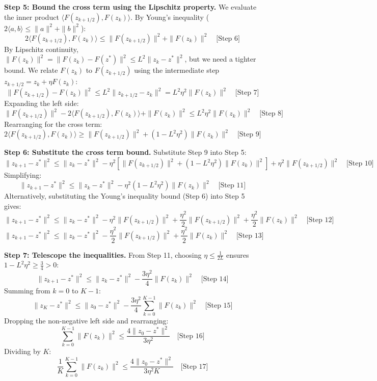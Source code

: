 \documentclass{article}
\begin{document}
\textbf{Step 5: Bound the cross term using the Lipschitz property.}
We evaluate the inner product $\langle F(z_{k+1/2}), F(z_k) \rangle$. By Young's inequality ($2\langle a, b \rangle \leq \|a\|^2 + \|b\|^2$):
$$ 2\langle F(z_{k+1/2}), F(z_k) \rangle \leq \|F(z_{k+1/2})\|^2 + \|F(z_k)\|^2 \quad \text{[Step 6]} $$
By Lipschitz continuity, $\|F(z_k)\|^2 = \|F(z_k) - F(z^*)\|^2 \leq L^2 \|z_k - z^*\|^2$, but we need a tighter bound. We relate $F(z_k)$ to $F(z_{k+1/2})$ using the intermediate step $z_{k+1/2} = z_k + \eta F(z_k)$:
$$ \|F(z_{k+1/2}) - F(z_k)\|^2 \leq L^2 \|z_{k+1/2} - z_k\|^2 = L^2 \eta^2 \|F(z_k)\|^2 \quad \text{[Step 7]} $$
Expanding the left side:
$$ \|F(z_{k+1/2})\|^2 - 2\langle F(z_{k+1/2}), F(z_k) \rangle + \|F(z_k)\|^2 \leq L^2 \eta^2 \|F(z_k)\|^2 \quad \text{[Step 8]} $$
Rearranging for the cross term:
$$ 2\langle F(z_{k+1/2}), F(z_k) \rangle \geq \|F(z_{k+1/2})\|^2 + (1 - L^2 \eta^2) \|F(z_k)\|^2 \quad \text{[Step 9]} $$

\textbf{Step 6: Substitute the cross term bound.}
Substitute Step 9 into Step 5:
$$ \|z_{k+1} - z^*\|^2 \leq \|z_k - z^*\|^2 - \eta^2 \left[ \|F(z_{k+1/2})\|^2 + (1 - L^2 \eta^2) \|F(z_k)\|^2 \right] + \eta^2 \|F(z_{k+1/2})\|^2 \quad \text{[Step 10]} $$
Simplifying:
$$ \|z_{k+1} - z^*\|^2 \leq \|z_k - z^*\|^2 - \eta^2 (1 - L^2 \eta^2) \|F(z_k)\|^2 \quad \text{[Step 11]} $$
Alternatively, substituting the Young's inequality bound (Step 6) into Step 5 gives:
$$ \|z_{k+1} - z^*\|^2 \leq \|z_k - z^*\|^2 - \eta^2 \|F(z_{k+1/2})\|^2 + \frac{\eta^2}{2} \|F(z_{k+1/2})\|^2 + \frac{\eta^2}{2} \|F(z_k)\|^2 \quad \text{[Step 12]} $$
$$ \|z_{k+1} - z^*\|^2 \leq \|z_k - z^*\|^2 - \frac{\eta^2}{2} \|F(z_{k+1/2})\|^2 + \frac{\eta^2}{2} \|F(z_k)\|^2 \quad \text{[Step 13]} $$

\textbf{Step 7: Telescope the inequalities.}
From Step 11, choosing $\eta \leq \frac{1}{2L}$ ensures $1 - L^2 \eta^2 \geq \frac{3}{4} > 0$:
$$ \|z_{k+1} - z^*\|^2 \leq \|z_k - z^*\|^2 - \frac{3\eta^2}{4} \|F(z_k)\|^2 \quad \text{[Step 14]} $$
Summing from $k=0$ to $K-1$:
$$ \|z_K - z^*\|^2 \leq \|z_0 - z^*\|^2 - \frac{3\eta^2}{4} \sum_{k=0}^{K-1} \|F(z_k)\|^2 \quad \text{[Step 15]} $$
Dropping the non-negative left side and rearranging:
$$ \sum_{k=0}^{K-1} \|F(z_k)\|^2 \leq \frac{4 \|z_0 - z^*\|^2}{3\eta^2} \quad \text{[Step 16]} $$
Dividing by $K$:
$$ \frac{1}{K} \sum_{k=0}^{K-1} \|F(z_k)\|^2 \leq \frac{4 \|z_0 - z^*\|^2}{3\eta^2 K} \quad \text{[Step 17]} $$
\end{document}
